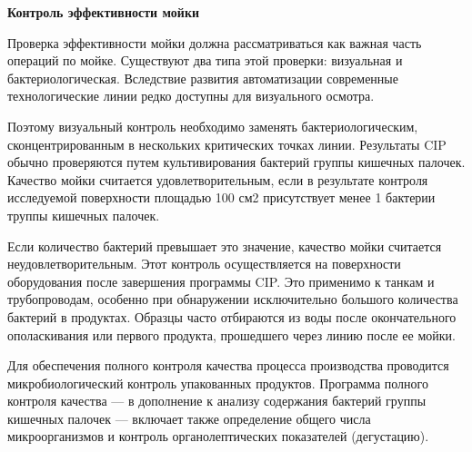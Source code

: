 \documentclass[a4paper,12pt,oneside]{extarticle}
\begin{document}
	\begin{flushleft}
		\bfseries 	Контроль эффективности мойки
	\end{flushleft}
	
	\begin{flushleft}
			Проверка эффективности мойки должна рассматриваться как важная часть операций по мойке. Существуют два типа этой проверки: визуальная и бактериологическая. Вследствие развития автоматизации современные технологические линии редко доступны для визуального осмотра.
	\end{flushleft}
	
	\begin{flushleft}
		Поэтому визуальный контроль необходимо заменять бактериологическим, сконцентрированным в нескольких критических точках линии. Результаты CIP обычно проверяются путем культивирования бактерий группы кишечных палочек. Качество мойки считается удовлетворительным, если в результате контроля исследуемой поверхности площадью 100 см2 присутствует менее 1 бактерии труппы кишечных палочек.
	\end{flushleft}
	
\begin{flushleft}
	Если количество бактерий превышает это значение, качество мойки считается неудовлетворительным. Этот контроль осуществляется на поверхности оборудования после завершения программы CIP. Это применимо к танкам и трубопроводам, особенно при обнаружении исключительно большого количества бактерий в продуктах. Образцы часто отбираются из воды после окончательного ополаскивания или первого продукта, прошедшего через линию после ее мойки.
\end{flushleft}

\begin{flushleft}
		Для обеспечения полного контроля качества процесса производства проводится микробиологический контроль упакованных продуктов. Программа полного контроля качества — в дополнение к анализу содержания бактерий группы кишечных палочек — включает также определение общего числа микроорганизмов и контроль органолептических показателей (дегустацию).
\end{flushleft}


	
	
\end{document}

